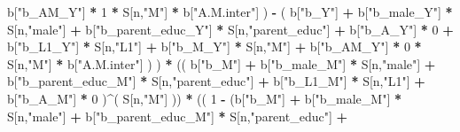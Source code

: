 \documentclass[
]{book}
\newenvironment{Shaded}{\begin{snugshade}}{\end{snugshade}}
\newcommand{\DecValTok}[1]{\textcolor[rgb]{0.00,0.00,0.81}{#1}}
\newcommand{\NormalTok}[1]{#1}
\newcommand{\SpecialCharTok}[1]{\textcolor[rgb]{0.81,0.36,0.00}{\textbf{#1}}}
\newcommand{\StringTok}[1]{\textcolor[rgb]{0.31,0.60,0.02}{#1}}
\begin{document}
\begin{Shaded}
\begin{Highlighting}[]
\NormalTok{                            b[}\StringTok{"b\_AM\_Y"}\NormalTok{] }\SpecialCharTok{*} \DecValTok{1} \SpecialCharTok{*}\NormalTok{ S[n,}\StringTok{"M"}\NormalTok{] }\SpecialCharTok{*}\NormalTok{ b[}\StringTok{"A.M.inter"}\NormalTok{] ) }\SpecialCharTok{{-}} 
\NormalTok{                          ( b[}\StringTok{"b\_Y"}\NormalTok{] }\SpecialCharTok{+} 
\NormalTok{                              b[}\StringTok{"b\_male\_Y"}\NormalTok{] }\SpecialCharTok{*}\NormalTok{ S[n,}\StringTok{"male"}\NormalTok{] }\SpecialCharTok{+} 
\NormalTok{                              b[}\StringTok{"b\_parent\_educ\_Y"}\NormalTok{] }\SpecialCharTok{*}\NormalTok{ S[n,}\StringTok{"parent\_educ"}\NormalTok{] }\SpecialCharTok{+} 
\NormalTok{                              b[}\StringTok{"b\_A\_Y"}\NormalTok{] }\SpecialCharTok{*} \DecValTok{0} \SpecialCharTok{+} 
\NormalTok{                              b[}\StringTok{"b\_L1\_Y"}\NormalTok{] }\SpecialCharTok{*}\NormalTok{ S[n,}\StringTok{"L1"}\NormalTok{] }\SpecialCharTok{+}
\NormalTok{                              b[}\StringTok{"b\_M\_Y"}\NormalTok{] }\SpecialCharTok{*}\NormalTok{ S[n,}\StringTok{"M"}\NormalTok{] }\SpecialCharTok{+} 
\NormalTok{                              b[}\StringTok{"b\_AM\_Y"}\NormalTok{] }\SpecialCharTok{*} \DecValTok{0} \SpecialCharTok{*}\NormalTok{ S[n,}\StringTok{"M"}\NormalTok{] }\SpecialCharTok{*}\NormalTok{ b[}\StringTok{"A.M.inter"}\NormalTok{] ) ) }\SpecialCharTok{*}
\NormalTok{    (( b[}\StringTok{"b\_M"}\NormalTok{] }\SpecialCharTok{+} 
\NormalTok{         b[}\StringTok{"b\_male\_M"}\NormalTok{] }\SpecialCharTok{*}\NormalTok{ S[n,}\StringTok{"male"}\NormalTok{] }\SpecialCharTok{+} 
\NormalTok{         b[}\StringTok{"b\_parent\_educ\_M"}\NormalTok{] }\SpecialCharTok{*}\NormalTok{ S[n,}\StringTok{"parent\_educ"}\NormalTok{] }\SpecialCharTok{+} 
\NormalTok{         b[}\StringTok{"b\_L1\_M"}\NormalTok{] }\SpecialCharTok{*}\NormalTok{ S[n,}\StringTok{"L1"}\NormalTok{] }\SpecialCharTok{+}
\NormalTok{         b[}\StringTok{"b\_A\_M"}\NormalTok{] }\SpecialCharTok{*} \DecValTok{0}\NormalTok{ )}\SpecialCharTok{\^{}}\NormalTok{( S[n,}\StringTok{"M"}\NormalTok{] )) }\SpecialCharTok{*} 
\NormalTok{    (( }\DecValTok{1} \SpecialCharTok{{-}}\NormalTok{ (b[}\StringTok{"b\_M"}\NormalTok{] }\SpecialCharTok{+} 
\NormalTok{              b[}\StringTok{"b\_male\_M"}\NormalTok{] }\SpecialCharTok{*}\NormalTok{ S[n,}\StringTok{"male"}\NormalTok{] }\SpecialCharTok{+} 
\NormalTok{              b[}\StringTok{"b\_parent\_educ\_M"}\NormalTok{] }\SpecialCharTok{*}\NormalTok{ S[n,}\StringTok{"parent\_educ"}\NormalTok{] }\SpecialCharTok{+} 

\end{Highlighting}
\end{Shaded}
\end{document}

